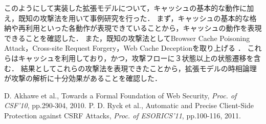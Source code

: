 \documentclass[a4paper]{jarticle}
\begin{document}
このようにして実装した拡張モデルについて，キャッシュの基本的な動作に加え，既知の攻撃法を用いて事例研究を行った．
まず，キャッシュの基本的な格納や再利用といった各動作が表現できていることから，キャッシュの動作を表現できることを確認した．
また，既知の攻撃法としてBrowser Cache Poisoning Attack，Cross-site Request Forgery，Web Cache Deceptionを取り上げる
．
これらはキャッシュを利用しており，かつ，攻撃フローに３状態以上の状態遷移を含む．
結果としてこれらの攻撃法を表現できたことから，拡張モデルの時相論理が攻撃の解析に十分効果があることを確認した．

\begin{thebibliography}{9}
 D. Akhawe et al., Towards a Formal Foundation of Web Security, \textit{Proc. of CSF'10}, pp.290-304, 2010.
 P. D. Ryck et al., Automatic and Precise Client-Side Protection against CSRF Attacks, \textit{Proc. of ESORICS'11}, pp.100-116, 2011.
\end{thebibliography}
\end{document}
